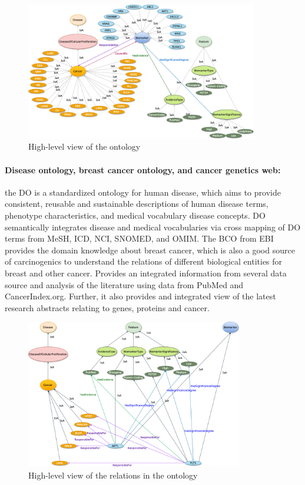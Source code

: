 \begin{figure}
	\centering
	\includegraphics[width=0.8\linewidth,height=60mm]{images/diagram_general_view.png}
	\caption{High-level view of the ontology} 
	\label{fig:main_ontology}
\end{figure}

\paragraph{Disease ontology, breast cancer ontology, and cancer genetics web:} \hspace*{-2.5mm} the DO is a standardized ontology for human disease, which aims to provide consistent, reusable and sustainable descriptions of human disease terms, phenotype characteristics, and medical vocabulary disease concepts. DO semantically integrates disease and medical vocabularies via cross mapping of DO terms from MeSH, ICD, NCI, SNOMED, and OMIM. The BCO from EBI provides the domain knowledge about breast cancer, which is also a good source of carcinogenics to understand the relations of different biological entities for breast and other cancer. Provides an integrated information from several data source and analysis of the literature using data from PubMed and CancerIndex.org. Further, it also provides and integrated view of the latest research abstracts relating to genes, proteins and cancer.  

\begin{figure}
	\centering
	\includegraphics[width=0.8\linewidth,height=65mm]{images/GeneralRelations-Ontology.png}
	\caption{High-level view of the relations in the ontology}
	\label{fig:main_ontology_relations}
	\vspace{-4mm}
\end{figure}

